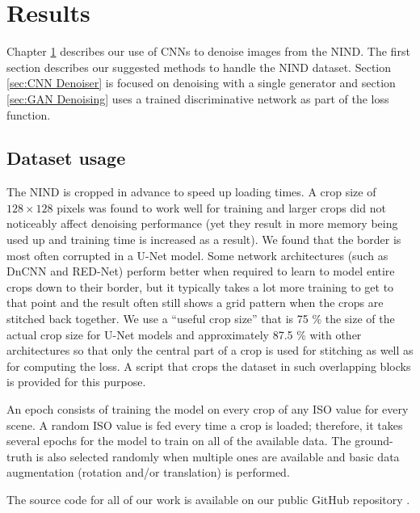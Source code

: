 \chapter{Results}\label{chap:Results}

Chapter \ref{chap:Results} describes our use of \acsp{CNN} to denoise images from the \ac{NIND}. The first section describes our suggested methods to handle the \ac{NIND} dataset. Section \ref{sec:CNN Denoiser} is focused on denoising with a single generator and section \ref{sec:GAN Denoising} uses a trained discriminative network as part of the loss function.

\section{Dataset usage}\label{sec:Dataset Usage}
The \ac{NIND} is cropped in advance to speed up loading times. A crop size of $128\times 128$ pixels was found to work well for training and larger crops did not noticeably affect denoising performance (yet they result in more memory being used up and training time is increased as a result). We found that the border is most often corrupted in a U-Net model. Some network architectures (such as DnCNN \cite{dncnn} and \ac{RED-Net}) perform better when required to learn to model entire crops down to their border, but it typically takes a lot more training to get to that point and the result often still shows a grid pattern when the crops are stitched back together. We use a ``useful crop size'' that is 75 \% the size of the actual crop size for U-Net models and approximately 87.5 \% with other architectures so that only the central part of a crop is used for stitching as well as for computing the loss. A script that crops the dataset in such overlapping blocks is provided for this purpose.

An epoch consists of training the model on every crop of any ISO value for every scene. A random ISO value is fed every time a crop is loaded; therefore, it takes several epochs for the model to train on all of the available data. The ground-truth is also selected randomly when multiple ones are available and basic data augmentation (rotation and/or translation) is performed.

The source code for all of our work is available on our public GitHub repository \cite{mthesis-denoise}.


